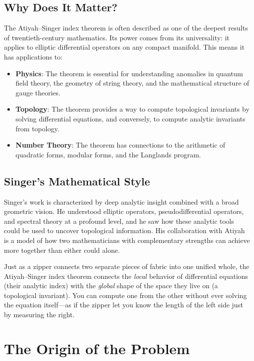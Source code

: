 \subsection{Why Does It Matter?}

The Atiyah--Singer index theorem is often described as one of the deepest results of twentieth-century mathematics. Its power comes from its universality: it applies to elliptic differential operators on any compact manifold. This means it has applications to:
\begin{itemize}
\item \textbf{Physics}: The theorem is essential for understanding anomalies in quantum field theory, the geometry of string theory, and the mathematical structure of gauge theories.
\item \textbf{Topology}: The theorem provides a way to compute topological invariants by solving differential equations, and conversely, to compute analytic invariants from topology.
\item \textbf{Number Theory}: The theorem has connections to the arithmetic of quadratic forms, modular forms, and the Langlands program.
\end{itemize}

\subsection{Singer's Mathematical Style}

Singer's work is characterized by deep analytic insight combined with a broad geometric vision. He understood elliptic operators, pseudodifferential operators, and spectral theory at a profound level, and he saw how these analytic tools could be used to uncover topological information. His collaboration with Atiyah is a model of how two mathematicians with complementary strengths can achieve more together than either could alone.

\begin{analogy}
Just as a zipper connects two separate pieces of fabric into one unified whole, the Atiyah--Singer index theorem connects the \emph{local} behavior of differential equations (their analytic index) with the \emph{global} shape of the space they live on (a topological invariant). You can compute one from the other without ever solving the equation itself---as if the zipper let you know the length of the left side just by measuring the right.
\end{analogy}

\section{The Origin of the Problem}


